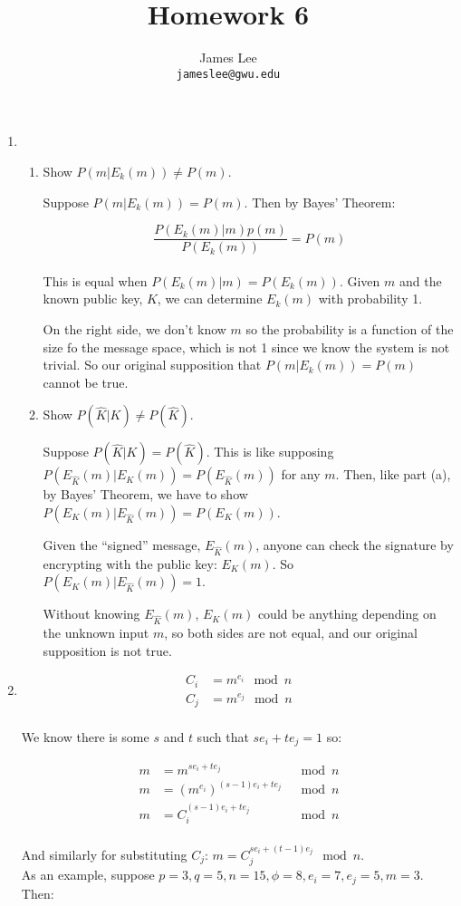 \documentclass{amsart}
\title{Homework 6}
\author{James Lee\\
\texttt{jameslee@gwu.edu}}
\begin{document}
\maketitle

\begin{enumerate}
\item
\begin{enumerate}
\item Show $P(m|E_k(m)) \ne P(m)$.

Suppose $P(m|E_k(m)) = P(m)$.  Then by Bayes' Theorem:

$$
\frac{P(E_k(m)|m)p(m)}{P(E_k(m))}=P(m)
$$
\\
This is equal when $P(E_k(m)|m)=P(E_k(m))$.  Given $m$ and the known public key, $K$, we can determine $E_k(m)$ with probability 1.

On the right side, we don't know $m$ so the probability is a function of the size fo the message space, which is not 1 since we know the system is not trivial.  So our original supposition that $P(m|E_k(m)) = P(m)$ cannot be true.

\item Show $P(\hat{K}|K) \ne P(\hat{K})$.

Suppose $P(\hat{K}|K) = P(\hat{K})$.  This is like supposing $P(E_{\hat{K}}(m)|E_K(m))=P(E_{\hat{K}}(m))$ for any $m$.  Then, like part (a), by Bayes' Theorem, we have to show $P(E_K(m)|E_{\hat{K}}(m))=P(E_K(m))$.

Given the ``signed'' message, $E_{\hat{K}}(m)$, anyone can check the signature by encrypting with the public key: $E_K(m)$.  So $P(E_K(m)|E_{\hat{K}}(m)) = 1$.

Without knowing $E_{\hat{K}}(m)$, $E_K(m)$ could be anything depending on the unknown input $m$, so both sides are not equal, and our original supposition is not true.
\end{enumerate}

\item
\begin{align*}
C_i&=m^{e_i}\mod n\\
C_j&=m^{e_j}\mod n
\end{align*}
\\
We know there is some $s$ and $t$ such that $se_i+te_j=1$ so:

\begin{align*}
m&=m^{se_i+te_j}&\mod n\\
m&=(m^{e_i})^{(s-1)e_i+te_j}&\mod n\\
m&=C_i^{(s-1)e_i+te_j}&\mod n
\end{align*}
\\
And similarly for substituting $C_j$: $m=C_j^{se_i+(t-1)e_j}\mod n$.
\\
As an example, suppose $p=3, q=5, n=15, \phi=8, e_i=7, e_j=5, m=3$.  Then:


\end{enumerate}
\end{document}
